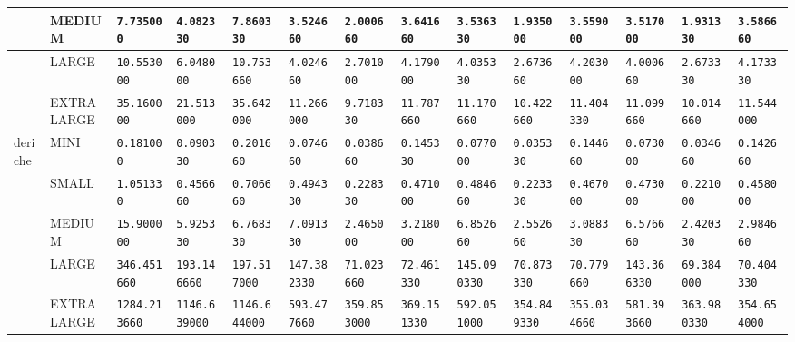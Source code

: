 \begin{tabular}{l | l | l | l | l | l | l | l | l | l | l | l | l | l}
             & MEDIUM     & \verb|7.735000     | & \verb|4.082330    | & \verb|7.860330    | & \verb|3.524660    | & \verb|2.000660    | & \verb|3.641660    | & \verb|3.536330    | & \verb|1.935000    | & \verb|3.559000    | & \verb|3.517000    | & \verb|1.931330    | & \verb|3.586660    | \\ \hline
             & LARGE      & \verb|10.553000    | & \verb|6.048000    | & \verb|10.753660   | & \verb|4.024660    | & \verb|2.701000    | & \verb|4.179000    | & \verb|4.035330    | & \verb|2.673660    | & \verb|4.203000    | & \verb|4.000660    | & \verb|2.673330    | & \verb|4.173330    | \\ \hline
             & EXTRALARGE & \verb|35.160000    | & \verb|21.513000   | & \verb|35.642000   | & \verb|11.266000   | & \verb|9.718330    | & \verb|11.787660   | & \verb|11.170660   | & \verb|10.422660   | & \verb|11.404330   | & \verb|11.099660   | & \verb|10.014660   | & \verb|11.544000   | \\ \hline
    deriche  & MINI       & \verb|0.181000     | & \verb|0.090330    | & \verb|0.201660    | & \verb|0.074660    | & \verb|0.038660    | & \verb|0.145330    | & \verb|0.077000    | & \verb|0.035330    | & \verb|0.144660    | & \verb|0.073000    | & \verb|0.034660    | & \verb|0.142660    | \\ \hline
             & SMALL      & \verb|1.051330     | & \verb|0.456660    | & \verb|0.706660    | & \verb|0.494330    | & \verb|0.228330    | & \verb|0.471000    | & \verb|0.484660    | & \verb|0.223330    | & \verb|0.467000    | & \verb|0.473000    | & \verb|0.221000    | & \verb|0.458000    | \\ \hline
             & MEDIUM     & \verb|15.900000    | & \verb|5.925330    | & \verb|6.768330    | & \verb|7.091330    | & \verb|2.465000    | & \verb|3.218000    | & \verb|6.852660    | & \verb|2.552660    | & \verb|3.088330    | & \verb|6.576660    | & \verb|2.420330    | & \verb|2.984660    | \\ \hline
             & LARGE      & \verb|346.451660   | & \verb|193.146660  | & \verb|197.517000  | & \verb|147.382330  | & \verb|71.023660   | & \verb|72.461330   | & \verb|145.090330  | & \verb|70.873330   | & \verb|70.779660   | & \verb|143.366330  | & \verb|69.384000   | & \verb|70.404330   | \\ \hline
             & EXTRALARGE & \verb|1284.213660  | & \verb|1146.639000 | & \verb|1146.644000 | & \verb|593.477660  | & \verb|359.853000  | & \verb|369.151330  | & \verb|592.051000  | & \verb|354.849330  | & \verb|355.034660  | & \verb|581.393660  | & \verb|363.980330  | & \verb|354.654000  | \\ \hline

\end{tabular}
